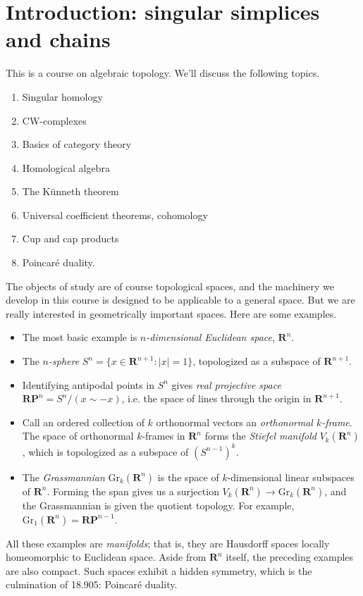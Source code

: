 
\section{Introduction: singular simplices and chains}\label{905}
This is a course on algebraic topology. 
We'll discuss the following topics. 
\begin{enumerate}
    \item Singular homology
    \item CW-complexes
    \item Basics of category theory
    \item Homological algebra
    \item The K\"{u}nneth theorem
    \item Universal coefficient theorems, cohomology
    \item Cup and cap products
    \item Poincar\'{e} duality.
\end{enumerate}
The objects of study are of course topological spaces, and the machinery
we develop in this course is designed to be applicable to a general space. 
But we are really interested in geometrically important spaces. Here are 
some examples. 
\begin{itemize}
    \item The most basic example is \emph{$n$-dimensional Euclidean space}, $\mathbf{R}^n$.
    \item The \emph{$n$-sphere} $S^n=\{x\in \mathbf{R}^{n+1}:|x|=1\}$, topologized as a subspace of $\mathbf{R}^{n+1}$.
    \item Identifying antipodal points in $S^n$ gives \emph{real projective space} $\mathbf{RP}^n=S^n / (x\sim -x)$, i.e. the space of lines through the origin in $\mathbf{R}^{n+1}$.
    \item Call an ordered collection of $k$ orthonormal vectors an \emph{orthonormal $k$-frame}. The space of orthonormal $k$-frames in $\mathbf{R}^n$ forms the \emph{Stiefel manifold} $V_k(\mathbf{R}^n)$, which is topologized as a subspace of $(S^{n-1})^k$.
   \item The \emph{Grassmannian}  $\mathrm{Gr}_k(\mathbf{R}^n)$ is the space of
$k$-dimensional linear subspaces of $\mathbf{R}^n$. Forming the span gives us
a surjection $V_k(\mathbf{R}^n)\to\mathrm{Gr}_k(\mathbf{R}^n)$, and the
Grassmannian is given the quotient topology. 
For example, $\mathrm{Gr}_1(\mathbf{R}^n) = \mathbf{RP}^{n-1}$.
\end{itemize}
All these examples are \emph{manifolds}; that is, they are Hausdorff spaces locally homeomorphic to Euclidean space. Aside from $\mathbf{R}^n$ itself, the preceding examples are also compact. Such spaces exhibit a hidden symmetry, which is the culmination of 18.905: Poincar\'{e} duality.

